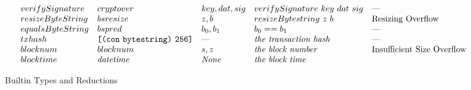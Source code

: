\documentclass[../main.tex]{subfiles}
\begin{document}
\begin{figure*}[t]
\[\begin{array}{lllll}
        verifySignature   &  cryptover  &   key, dat, sig           & verifySignature ~ key ~ dat ~ sig   &   \textrm{---}          \\
        
        resizeByteString   &   bsresize   &   z, b   &   resizeBytestring ~ z ~ b   &   \textrm{Resizing Overflow} \\
        
        equalsByteString  &   bspred   &   b_0 , b_1   & b_0 == b_1   &   \textrm{---}  \\
        
        txhash   &   \texttt{[} \texttt{(} \texttt{con} ~ \texttt{bytestring} \texttt{)} ~ \texttt{256} \texttt{]}   &   \textrm{---}  & \textit{the transaction hash}   &   \textrm{---}  \\
        
        blocknum  &  blocknum  & s, z & \textit{the block number}   &   \textrm{Insufficient Size Overflow}  \\
        
        blocktime &  \mathit{datetime}  &  \textit{None}  & \textit{the block time}   &   \textrm{}  \\
    \end{array}\]
    
    \caption{Builtin Types and Reductions}
    \label{fig:Plutus_core_builtins}
\end{figure*}

\normalsize
\end{document}
